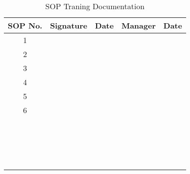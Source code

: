 \documentclass{article}
\begin{document}
\begin{table}[h]
	\caption{SOP Traning Documentation}
	\label{tab:Documentation}
		\begin{tabular}{|c|p{4cm}|p{2cm}|p{4cm}|p{2cm}|}\hline
SOP No. & Signature & Date  & Manager & Date \\
\hline
1  & & & & \\ [1.2ex]\hline
2  & & & & \\ [1.2ex]\hline
3  & & & & \\ [1.2ex]\hline
4  & & & & \\ [1.2ex]\hline
5  & & & & \\ [1.2ex]\hline
6  & & & & \\ [1.2ex]\hline
  & & & & \\ [1.2ex]\hline
  & & & & \\ [1.2ex]\hline
  & & & & \\ [1.2ex]\hline
  & & & & \\ [1.2ex]\hline
  & & & & \\ [1.2ex]\hline
  & & & & \\ [1.2ex]\hline
  & & & & \\ [1.2ex]\hline
  & & & & \\ [1.2ex]\hline
  & & & & \\ [1.2ex]\hline
  & & & & \\ [1.2ex]\hline
  & & & & \\ [1.2ex]\hline
  & & & & \\ [1.2ex]\hline
  & & & & \\ [1.2ex]\hline
  & & & & \\ [1.2ex]\hline
  & & & & \\ [1.2ex]\hline
  & & & & \\ [1.2ex]\hline
  & & & & \\ [1.2ex]\hline
  & & & & \\ [1.2ex]\hline
		\end{tabular}

\end{table}
\end{document}
